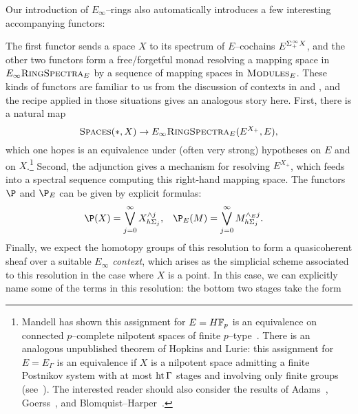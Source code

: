 Our introduction of \(E_\infty\)--rings also automatically introduces a few interesting accompanying functors:
\begin{center}
\end{center}
The first functor sends a space \(X\) to its spectrum of \(E\)--cochains \(E^{\Sigma^\infty_+ X}\), and the other two functors form a free/forgetful monad resolving a mapping space in \(E_\infty\normalfont\textsc{RingSpectra}_E\) by a sequence of mapping spaces in \(\normalfont\textsc{Modules}_E\).  These kinds of functors are familiar to us from the discussion of contexts in  and , and the recipe applied in those situations gives an analogous story here.  First, there is a natural map \[\normalfont\textsc{Spaces}(*, X) \to E_\infty\normalfont\textsc{RingSpectra}_E(E^{X_+}, E),\] which one hopes is an equivalence under (often very strong) hypotheses on \(E\) and on \(X\).\footnote{Mandell has shown this assignment for \(E = \HFp\) is an equivalence on connected \(p\)--complete nilpotent spaces of finite \(p\)--type~\cite{Mandell}.  There is an analogous unpublished theorem of Hopkins and Lurie: this assignment for \(E = E_\Gamma\) is an equivalence if \(X\) is a nilpotent space admitting a finite Postnikov system with at most \(\operatorname{ht} \Gamma\) stages and involving only finite groups (see~\cite[Conjecture 5.4.14, Corollary 5.4.10.(2)]{HopkinsLurie}).  The interested reader should also consider the results of Adams~\cite{AdamsOnCobar}, Goerss~\cite{GoerssChains}, and Blomquist--Harper~\cite{BlomquistHarper}.}  Second, the adjunction gives a mechanism for resolving \(E^{X_+}\), which feeds into a spectral sequence computing this right-hand mapping space.  The functors \(\P\) and \(\P_E\) can be given by explicit formulas:
\begin{align*}
\P(X) & = \bigvee_{j=0}^\infty X^{\sm j}_{h\Sigma_j}, &
\P_E(M) & = \bigvee_{j=0}^\infty M^{\sm_E j}_{h\Sigma_j}.
\end{align*}
Finally, we expect the homotopy groups of this resolution to form a quasicoherent sheaf over a suitable \emph{\(E_\infty\) context}, which arises as the simplicial scheme associated to this resolution in the case where \(X\) is a point.  In this case, we can explicitly name some of the terms in this resolution: the bottom two stages take the form
